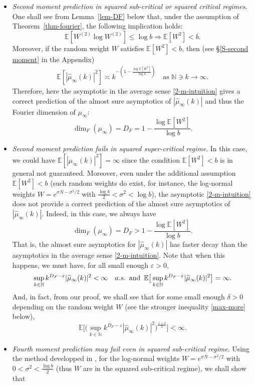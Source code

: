 \documentclass[12pt]{amsart}
\theoremstyle{definition}
\theoremstyle{remark}
\newcommand{\N}{\mathbb{N}}
\newcommand{\E}{\mathbb{E}}
\newcommand{\an}{\text{\, and \,}}
\numberwithin{equation}{section}
\begin{document}
 \begin{itemize}
 \item {\it Second moment prediction in squared sub-critical or squared critical regimes}.   One shall see from  Lemma~\ref{lem-DF} below that,  under the assumption of Theorem~\ref{thm-fourier},   the following  implication holds: 
\[
\E [ W^{(2)}\log W^{(2)}] \le \log b \Longrightarrow \E[W^2]<b. 
\]
Moreover, if  the random weight $W$ satisfies $\E[W^2]<b$, then (see \S \ref{S-second moment} in the Appendix) 
	\begin{align}\label{2-m-intuition}
	\E[|\widehat{\mu}_\infty(k)|^2] \asymp k^{-(1-\frac{\log \E[W^2]}{\log b})} \quad \text{as $\N\ni k\to\infty$}.
	\end{align}
Therefore,  here the asymptotic in the average sense \eqref{2-m-intuition}  gives a correct prediction of the almost sure asymptotics of $|\widehat{\mu}_\infty(k)|$ and thus the Fourier dimension of $\mu_\infty$: 
\[
\dim_F(\mu_\infty)= D_F = 1-\frac{\log \E[W^2]}{\log b}. 
\]
 \item {\it Second moment prediction fails in  squared super-critical regime}.  In this case, we could have $\E[|\widehat{\mu}_\infty(k)|^2] = \infty$ since the condition $\E[W^2]<b$ is in general not guaranteed. Moreover,  even under the additional assumption $\E[W^2]<b$ (such random weights do exist, for instance, the log-normal weights $W = e^{\sigma N- \sigma^2/2}$ with $\frac{\log b}{2} < \sigma^2 <\log b$),  the   asymptotic  \eqref{2-m-intuition} does not provide a correct prediction of  the almost sure asymptotics of $|\widehat{\mu}_\infty(k)|$. Indeed,  in this case, we always have 
 \[
\dim_F(\mu_\infty)   = D_F >1-\frac{\log \E[W^2]}{\log b}.
 \]
 That is, the almost sure asymptotics  for  $|\widehat{\mu}_\infty(k)|$ has faster decay than the asymptotics in the average sense \eqref{2-m-intuition}. Note that when this happens, we must have,   for all  small enough $\varepsilon>0$, 
 \[
 \sup_{k\in \N}  k^{D_F - \varepsilon} |\widehat{\mu}_\infty(k)|^2 <\infty   \quad a.s.  \an \E \big[ \sup_{k\in \N}  k^{D_F - \varepsilon} |\widehat{\mu}_\infty(k)|^2\big] = \infty. 
 \]
And, in fact,  from our proof, we shall see that for some small enough $\delta>0$ depending on the random weight $W$ (see the stronger inequality \eqref{max-more} below),  
\[
 \E\big [ \big( \sup_{k\in \N}  k^{D_F - \varepsilon} |\widehat{\mu}_\infty(k)|^2\big)^{\frac{1+\delta}{2}}\big] < \infty.
\]
\item {\it Fourth moment prediction may fail even in squared sub-critical regime}.  Using the method developped in \cite{HQW-23},  for the log-normal weights $W= e^{\sigma N - \sigma^2/2}$ with  $0<\sigma^2< \frac{ \log b}{2}$ (thus $W$ are in the squared sub-critical regime), we shall show that 

\end{itemize}
\end{document}
